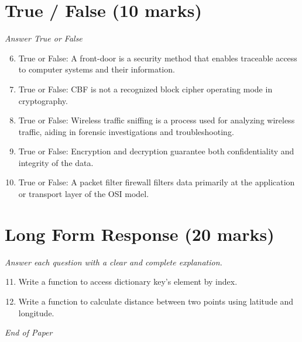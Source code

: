 \documentclass[12pt]{article}
\begin{document}
\section*{True / False (10 marks)}
\textit{Answer True or False}
\begin{enumerate}[label=\arabic*.]
\setcounter{enumi}{5}
\item True or False: A front-door is a security method that enables traceable access to computer systems and their information.
\item True or False: CBF is not a recognized block cipher operating mode in cryptography.
\item True or False: Wireless traffic sniffing is a process used for analyzing wireless traffic, aiding in forensic investigations and troubleshooting.
\item True or False: Encryption and decryption guarantee both confidentiality and integrity of the data.
\item True or False: A packet filter firewall filters data primarily at the application or transport layer of the OSI model.
\end{enumerate}

\section*{Long Form Response (20 marks)}
\textit{Answer each question with a clear and complete explanation.}
\begin{enumerate}[label=\arabic*.]
\setcounter{enumi}{10}
\item Write a function to access dictionary key's element by index.
\item Write a function to calculate distance between two points using latitude and longitude.
\end{enumerate}

\vfill
\noindent\textit{End of Paper}
\end{document}
